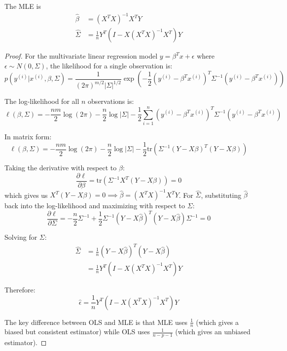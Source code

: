   \begin{theorem}
    The MLE is 
    \begin{align}
      \hat{\beta} & = (X^T X)^{-1} X^T Y \\ 
      \hat{\Sigma} & = \frac{1}{n} Y^T (I - X (X^T X)^{-1} X^T) Y
    \end{align}
  \end{theorem}
  \begin{proof}
    For the multivariate linear regression model $y = \beta^T x + \epsilon$ where $\epsilon \sim N(0, \Sigma)$, the likelihood for a single observation is:
    \begin{equation}
      p(y^{(i)} | x^{(i)}, \beta, \Sigma) = \frac{1}{(2\pi)^{m/2}|\Sigma|^{1/2}} \exp\left(-\frac{1}{2}(y^{(i)} - \beta^T x^{(i)})^T \Sigma^{-1} (y^{(i)} - \beta^T x^{(i)})\right)
    \end{equation}
   
    The log-likelihood for all $n$ observations is:
    \begin{equation}
      \ell(\beta, \Sigma) = -\frac{nm}{2}\log(2\pi) - \frac{n}{2}\log|\Sigma| - \frac{1}{2}\sum_{i=1}^n (y^{(i)} - \beta^T x^{(i)})^T \Sigma^{-1} (y^{(i)} - \beta^T x^{(i)})
    \end{equation}
   
    In matrix form:
    \begin{equation}
      \ell(\beta, \Sigma) = -\frac{nm}{2}\log(2\pi) - \frac{n}{2}\log|\Sigma| - \frac{1}{2}\text{tr}(\Sigma^{-1}(Y - X\beta)^T(Y - X\beta))
    \end{equation}
   
    Taking the derivative with respect to $\beta$:
    \begin{equation}
      \frac{\partial \ell}{\partial \beta} = \text{tr}(\Sigma^{-1}X^T(Y - X\beta)) = 0
    \end{equation}
    which gives us $X^T(Y - X\beta) = 0 \implies \hat{\beta} = (X^TX)^{-1}X^TY$. For $\hat{\Sigma}$, substituting $\hat{\beta}$ back into the log-likelihood and maximizing with respect to $\Sigma$:
    \begin{equation}
      \frac{\partial \ell}{\partial \Sigma} = -\frac{n}{2}\Sigma^{-1} + \frac{1}{2}\Sigma^{-1}(Y - X\hat{\beta})^T(Y - X\hat{\beta})\Sigma^{-1} = 0
    \end{equation}
   
    Solving for $\Sigma$:
    \begin{align}
      \hat{\Sigma} &= \frac{1}{n}(Y - X\hat{\beta})^T(Y - X\hat{\beta}) \\
      &= \frac{1}{n}Y^T(I - X(X^TX)^{-1}X^T)Y
    \end{align}
   
    Therefore:
    \begin{equation}
      \hat{\epsilon} = \frac{1}{n}Y^T(I - X(X^TX)^{-1}X^T)Y
    \end{equation}
   
    The key difference between OLS and MLE is that MLE uses $\frac{1}{n}$ (which gives a biased but consistent estimator) while OLS uses $\frac{1}{n-p-1}$ (which gives an unbiased estimator).
  \end{proof}

